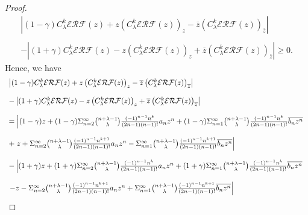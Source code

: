 \documentclass[10pt,a4paper]{amsart}
\begin{document}
\begin{proof}
\begin{equation*}
\begin{array}{l}
\left\vert (1-\gamma )C_{\lambda }^{k}\mathcal{ERF}(z)+z\left( C_{\lambda
}^{k}\mathcal{ERF}(z)\right) _{z}-\overline{z}\left( C_{\lambda }^{k}%
\mathcal{ERF}(z)\right) _{\overline{z}}\right\vert \\ 
\\ 
-\left\vert (1+\gamma )C_{\lambda }^{k}\mathcal{ERF}(z)-z\left( C_{\lambda
}^{k}\mathcal{ERF}(z)\right) _{z}+\overline{z}\left( C_{\lambda }^{k}%
\mathcal{ERF}(z)\right) _{\overline{z}}\right\vert \geq 0.%
\end{array}%
\end{equation*}
Hence, we have%
\begin{equation*}
\begin{array}{l}
\left\vert (1-\gamma )C_{\lambda }^{k}\mathcal{ERF}(z)+z\left( C_{\lambda
}^{k}\mathcal{ERF}(z)\right) _{z}-\overline{z}\left( C_{\lambda }^{k}%
\mathcal{ERF}(z)\right) _{\overline{z}}\right\vert \\ 
\\ 
-\left\vert (1+\gamma )C_{\lambda }^{k}\mathcal{ERF}(z)-z\left( C_{\lambda
}^{k}\mathcal{ERF}(z)\right) _{z}+\overline{z}\left( C_{\lambda }^{k}%
\mathcal{ERF}(z)\right) _{\overline{z}}\right\vert \\ 
\\ 
=\left\vert (1-\gamma )z+(1-\gamma )\Sigma_{n=2}^{\infty}
\binom{n+\lambda -1}{\lambda }\frac{(-1)^{n-1}n^{k}}{(2n-1)(n-1)!}%
a_{n}z^{n}+(1-\gamma )\Sigma_{n=1}^{\infty}\binom{%
n+\lambda -1}{\lambda }\frac{(-1)^{n-1}n^{k}}{(2n-1)(n-1)!}\overline{%
b_{n}z^{n}}\right. \\ 
\\ 
+\left. z+\Sigma_{n=2}^{\infty}\binom{n+\lambda -1}{%
\lambda }\frac{(-1)^{n-1}n^{k+1}}{(2n-1)(n-1)!}a_{n}z^{n}-\Sigma_{n=1}^{\infty}\binom{n+\lambda -1}{\lambda }\frac{(-1)^{n-1}n^{k+1}}{%
(2n-1)(n-1)!}\overline{b_{n}z^{n}}\right\vert \\ 
\\ 
-\left\vert (1+\gamma )z+(1+\gamma )\Sigma_{n=2}^{\infty}
\binom{n+\lambda -1}{\lambda }\frac{(-1)^{n-1}n^{k}}{(2n-1)(n-1)!}
a_{n}z^{n}+(1+\gamma )\Sigma_{n=1}^{\infty}\binom{n+\lambda -1}{\lambda }\frac{(-1)^{n-1}n^{k}}{(2n-1)(n-1)!}\overline{%
b_{n}z^{n}}\right. \\ 
\\ 
\left. -z-\Sigma_{n=2}^{\infty}\binom{n+\lambda -1}{%
\lambda }\frac{(-1)^{n-1}n^{k+1}}{(2n-1)(n-1)!}a_{n}z^{n}+\Sigma_{n=1}^{\infty}\binom{n+\lambda -1}{\lambda }\frac{(-1)^{n-1}n^{k+1}}{%
(2n-1)(n-1)!}\overline{b_{n}z^{n}}\right\vert%
\end{array}

\end{equation*}
\end{proof}
\end{document}
